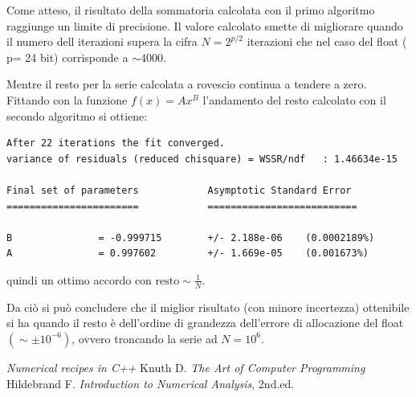 \documentclass{article}
\begin{document}
Come atteso, il risultato della sommatoria calcolata con il primo algoritmo raggiunge un limite di precisione. Il valore calcolato smette di migliorare quando il numero dell iterazioni supera la cifra $N =2^{p/2}$ iterazioni che nel caso del float ( p= 24 bit) corrisponde a $\sim 4000$.

Mentre il resto per la serie calcolata a rovescio continua a tendere a zero.
Fittando con la funzione $f(x) = A x^{B}$ l'andamento del resto calcolato con il secondo algoritmo si ottiene:

\begin{lstlisting}[frame=single]
After 22 iterations the fit converged.
variance of residuals (reduced chisquare) = WSSR/ndf   : 1.46634e-15

Final set of parameters            Asymptotic Standard Error
=======================            ==========================

B               = -0.999715        +/- 2.188e-06    (0.0002189%)
A               = 0.997602         +/- 1.669e-05    (0.001673%)
\end{lstlisting}

quindi un ottimo accordo con $ \textrm{resto} \sim \frac{1}{N}$.

Da ciò si può concludere che il miglior risultato (con minore incertezza) ottenibile si ha quando il resto è dell'ordine di grandezza dell'errore di allocazione del float $( \sim \pm 10^{-6} )$, ovvero troncando la serie ad  $N = 10^{6}$.

\begin{thebibliography}{99}
\emph{Numerical recipes in C++}
Knuth D. \emph{The Art of Computer Programming}
Hildebrand F. \emph{Introduction to Numerical Analysis}, 2nd.ed.
\end{thebibliography}
\end{document}
